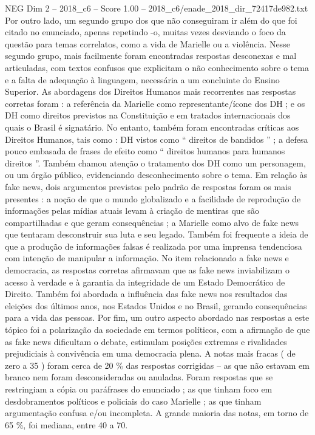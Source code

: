 \begin{textsample}{NEG Dim 2 – 2018\_c6 – Score 1.00 – 2018\_c6/enade\_2018\_dir\_72417de982.txt}
Por outro lado, um segundo grupo dos que não conseguiram ir além do que foi citado no enunciado, apenas repetindo -o, muitas vezes desviando o foco da questão para temas correlatos, como a vida de Marielle ou a violência.
Nesse segundo grupo, mais facilmente foram encontradas respostas desconexas e mal articuladas, com textos confusos que explicitam o não conhecimento sobre o tema e a falta de adequação à linguagem, necessária a um concluinte do Ensino Superior.
As abordagens dos Direitos Humanos mais recorrentes nas respostas corretas foram : a referência da Marielle como representante/ícone dos DH ; e os DH como direitos previstos na Constituição e em tratados internacionais dos quais o Brasil é signatário.
No entanto, também foram encontradas críticas aos Direitos Humanos, tais como : DH vistos como “ direitos de bandidos ” ; a defesa pouco embasada de frases de efeito como “ direitos humanos para humanos direitos ”.
Também chamou atenção o tratamento dos DH como um personagem, ou um órgão público, evidenciando desconhecimento sobre o tema.
Em relação às fake news, dois argumentos previstos pelo padrão de respostas foram os mais presentes : a noção de que o mundo globalizado e a facilidade de reprodução de informações pelas mídias atuais levam à criação de mentiras que são compartilhadas e que geram consequências ; a Marielle como alvo de fake news que tentaram desconstruir sua luta e seu legado.
Também foi frequente a ideia de que a produção de informações falsas é realizada por uma imprensa tendenciosa com intenção de manipular a informação.
No item relacionado a fake news e democracia, as respostas corretas afirmavam que as fake news inviabilizam o acesso à verdade e à garantia da integridade de um Estado Democrático de Direito.
Também foi abordada a influência das fake news nos resultados das eleições dos últimos anos, nos Estados Unidos e no Brasil, gerando consequências para a vida das pessoas.
Por fim, um outro aspecto abordado nas respostas a este tópico foi a polarização da sociedade em termos políticos, com a afirmação de que as fake news dificultam o debate, estimulam posições extremas e rivalidades prejudiciais à convivência em uma democracia plena.
A notas mais fracas ( de zero a 35 ) foram cerca de 20 \% das respostas corrigidas – as que não estavam em branco nem foram desconsideradas ou anuladas.
Foram respostas que se restringiam a cópia ou paráfrases do enunciado ; as que tinham foco em desdobramentos políticos e policiais do caso Marielle ; as que tinham argumentação confusa e/ou incompleta.
A grande maioria das notas, em torno de 65 \%, foi mediana, entre 40 a 70.

\end{textsample}
